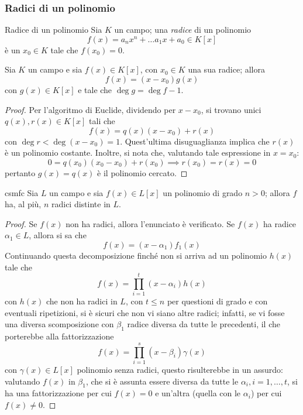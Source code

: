 \documentclass[11pt, a4paper]{scrartcl}
\theoremstyle{definition}
\numberwithin{esempio}{section}
\theoremstyle{definition}
\numberwithin{obs}{section}
\numberwithin{nota}{section}
\numberwithin{equation}{subsection}
\begin{document}
\subsubsection{Radici di un polinomio}
\begin{definizione}
	{Radice di un polinomio}{}
	Sia $K$ un campo; una \textit{radice} di un polinomio 
	\[
		f(x) = a_nx^n + \ldots a_1x + a_0 \in K[x]
	\] 
	\`e un $x_0 \in K$ tale che $f(x_0) = 0$.
\end{definizione}
\begin{lemma}
	{}{}
	Sia $K$ un campo e sia $f(x) \in K[x]$, con $x_0 \in K$ una sua radice; allora
	\[
	f(x)= (x-x_0) g(x)
	\] 
	con $g(x) \in K[x]$ e tale che $\operatorname{deg} g = \operatorname{deg} f - 1$.
	\begin{proof}
		Per l'algoritmo di Euclide, dividendo per $x-x_0$, si trovano unici $q(x),r(x) \in K[x]$ tali che
		\[
		f(x) = q(x) (x- x_0) + r(x)
		\] 
		con $\operatorname{deg} r < \operatorname{deg} (x-x_0) = 1$.
		Quest'ultima disuguaglianza implica che $r(x)$ \`e un polinomio costante. 
		Inoltre, si nota che, valutando tale espressione in $x=x_0$:
		\[
		0 = q(x_0)(x_0-x_0) + r(x_0) \implies r(x_0)=r(x) = 0
		\] 
		pertanto $g(x) = q(x)$ \`e il polinomio cercato.
	\end{proof}
\end{lemma}
\begin{teorema}
	{}{csmfc}
	Sia $L$ un campo e sia $f(x) \in L[x]$ un polinomio di grado $n>0$; allora $f$ ha, al pi\`u, $n$ radici distinte in $L$.
	\begin{proof}
		Se $f(x)$ non ha radici, allora l'enunciato \`e verificato.
		Se $f(x)$ ha radice $\alpha _1 \in L$, allora si sa che
		\[
		f(x) = (x-\alpha _1) f_1(x)
		\] 
		Continuando questa decomposizione finch\'e non si arriva ad un polinomio $h(x)$ tale che
		\[
		f(x) = \prod_{i=1} ^t (x-\alpha _i) h(x)
		\] 
		con $h(x)$ che non ha radici in $L$, con $t\le n$ per questioni di grado e con eventuali ripetizioni, si \`e sicuri che non vi siano altre radici; infatti, se vi fosse una diversa scomposizione con $\beta _1$ radice diversa da tutte le precedenti, il che porterebbe alla fattorizzazione
		\[
			f(x) = \prod_{i=1} ^s (x-\beta _i) \gamma(x)
		\] 
		con $\gamma(x) \in L[x]$ polinomio senza radici, questo risulterebbe in un assurdo: valutando $f(x)$ in $\beta _1$, che si \`e assunta essere diversa da tutte le $\alpha _i, i=1,\ldots,t$, si ha una fattorizzazione per cui $f(x)=0$ e un'altra (quella con le $\alpha _i$) per cui $f(x) \neq 0$.
	\end{proof}
\end{teorema}
\end{document}
